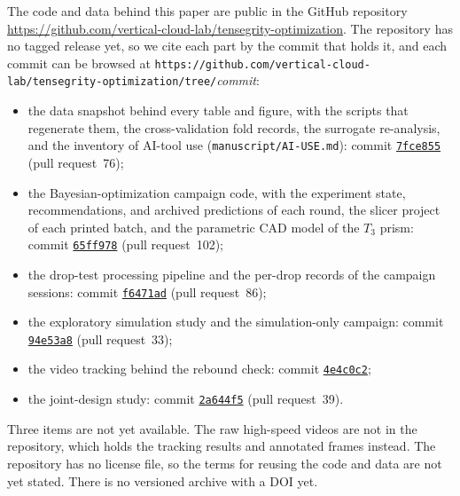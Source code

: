 \documentclass[11pt]{article}
\newcommand{\repo}{https://github.com/vertical-cloud-lab/tensegrity-optimization}
\begin{document}
The code and data behind this paper are public in the GitHub repository
\url{\repo}. The repository has no tagged release yet, so we cite each
part by the commit that holds it, and each commit can be browsed at
\texttt{\repo/tree/}\textit{commit}:
\begin{itemize}
  \item the data snapshot behind every table and figure, with the scripts
    that regenerate them, the cross-validation fold records, the surrogate
    re-analysis, and the inventory of AI-tool use
    (\texttt{manuscript/AI-USE.md}): commit
    \href{\repo/tree/7fce855563f6aa372911d6562cbebe8124553ea3}{\texttt{7fce855}}
    (pull request~76);
  \item the Bayesian-optimization campaign code, with the experiment
    state, recommendations, and archived predictions of each round, the
    slicer project of each printed batch, and the parametric CAD model of
    the $T_3$ prism: commit
    \href{\repo/tree/65ff9788a363025746463a463f10d3da7456ac11}{\texttt{65ff978}}
    (pull request~102);
  \item the drop-test processing pipeline and the per-drop records of the
    campaign sessions: commit
    \href{\repo/tree/f6471adb34cb5f2d0eba571d5005f4e250241fec}{\texttt{f6471ad}}
    (pull request~86);
  \item the exploratory simulation study and the simulation-only campaign:
    commit
    \href{\repo/tree/94e53a8efa331bb53855f971d998d95e5ef89b14}{\texttt{94e53a8}}
    (pull request~33);
  \item the video tracking behind the rebound check: commit
    \href{\repo/tree/4e4c0c2405dce793bcc53369c896ac078fa957f8}{\texttt{4e4c0c2}};
  \item the joint-design study: commit
    \href{\repo/tree/2a644f5844d9fe9460a2bcf641ca5e99e0fe3666}{\texttt{2a644f5}}
    (pull request~39).
\end{itemize}
Three items are not yet available. The raw high-speed videos are not in
the repository, which holds the tracking results and annotated frames
instead. The repository has no license file, so the terms for reusing
the code and data are not yet stated. There is no versioned archive with
a DOI yet.

\end{document}
